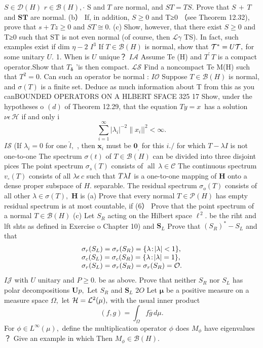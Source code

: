 $S\in{\mathcal{D}}(H)$ $r\in{\mathcal{B}}(H),\cdot$ S and ${\mathbf{}}T$ are normal, and $S T=T S.$ Prove that $\scriptstyle{S\,+\,T}$ and ${\boldsymbol{S}}{\boldsymbol{T}}$ are normal. (b） If, in addition, $S\geq0$ and T≥0 （see Theorem 12.32), prove that $\textstyle s+T z\geq0$ and $S T\cong0.$ (c) Show, however, that there exist $S\geq0$ and T≥0 such that ST is not even normal (of course, then ${\mathcal{L}}\gamma$ TS). In fact, such examples exist if dim $\textstyle\eta-2$ $\mathit{I}_{}^{3}$ If $T\in{\mathcal{B}}(H)$ is normal, show that ${\cal T}^{*}=U{\cal T},$ for some unitary $U.$ 1. When is $U$ unique？ $I{\mathcal{A}}$ Assume Te (H) and $\scriptstyle T^{\prime}\,T$ is a compact operator.Show that $T_{\mathbf{\delta}}$ 'is then compact. ${\mathcal{L}}{\mathcal{S}}$ Find a noncompact Te M(H) such that $T^{2}=0.$ Can such an operator be normal : $I{\mathcal{O}}$ Suppose $T\in{\mathcal{B}}(H)$ is normal, and $\sigma(T)$ is a finite set. Deduce as much information about T from this as you canBOUNDED OPERATORS ON A HLBERT SFACE 325 17 Show, under the hypotheses o $(d)$ of Theorem 12.29, that the equation $T y=x\,$ has a solution $\nu\epsilon\,\mathcal{H}$ if and only i $$ \sum_{i=1}^{\infty}|\lambda_{i}|^{-2}\|x_{i}||^{2}<\infty. $$ $I{\mathcal{S}}$ (If $\lambda_{i}=0$ for one ${\hat{l}},$ , then ${\boldsymbol{x}}_{i}$ must be $\mathbf{0}_{\!,\!}$ for this $i.{\big/}$ for which $T-\lambda I$ is not one-to-one The spectrum $\sigma(t)$ of $T\in{\mathcal{B}}(H)$ can be divided into three disjoint pices The point spectrum $\sigma_{s}(T)$ consists of $\operatorname{all}\,\lambda\in{\mathcal{C}}$ The continuous spectrum $\scriptstyle v_{\circ}(T)$ consists of all $\lambda\epsilon\,c$ such that $T\-\lambda I$ is a one-to-one mapping of ${\boldsymbol{H}}$ onto a dense proper subspace of $H.$ separable. The residual spectrum $\sigma_{o}(T)$ consists of all other $\lambda\in\sigma(T),$ ${\boldsymbol{H}}$ is (a) Prove that every normal $T\in{\mathcal{P}}(H)$ has empty residual spectrum is at most countable, if (6） Prove that the point spectrum of a normal $T\in{\mathcal{B}}(H)$ (c) Let $S_{R}$ acting on the Hilbert space $\ell^{\,2}.$ be the riht and lft shts as defined in Exercise o Chapter 10) and ${\boldsymbol{S}}_{L}$ Prove that $(S_{R})^{*}-S_{L}$ and that $$ \begin{array}{l c r}{{\sigma_{r}(S_{L})=\sigma_{r}(S_{R})=\{\lambda\!:\!\left|\lambda\right|<1\},}}\\ {{\sigma_{c}(S_{L})=\sigma_{c}(S_{R})=\{\lambda\!:\!\left|\lambda\right|=1\},}}\\ {{\sigma_{r}(S_{L})=\sigma_{r}(S_{R})=\sigma_{r}(S_{R})=\mathcal{O}.}}\end{array} $$ $I{\mathcal{J}}$ with $U$ unitary and $\scriptstyle P\geq0.$ be as above. Prove that neither $S_{R}$ nor $S_{L}$ has polar decompositions ${\boldsymbol{U}}p,$ Let $S_{R}$ and ${\boldsymbol{S}}_{L}$ $2O$ Let ${\boldsymbol{\mu}}$ be a positive measure on a measure space $\Omega,$ let ${\cal H}={\cal L}^{2}(\mu),$ with the usual inner product $$ (f,g)=\int_{\Omega}f{\bar{g}}\,d\mu. $$ For $\phi\in L^{\infty}(\mu),$ define the multiplication operator $\phi$ does $M_{\phi}$ have eigenvalues ？ Give an example in which Then $M_{\phi}\in\mathcal{B}(H).$ 